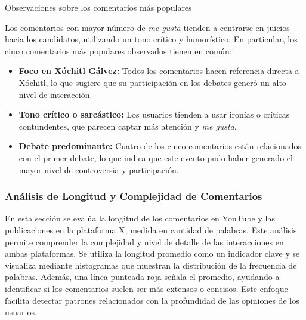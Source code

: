 \documentclass[10pt, a4paper]{article}
\begin{document}
	
	Observaciones sobre los comentarios más populares
	
	Los comentarios con mayor número de \textit{me gusta} tienden a centrarse en juicios hacia los candidatos, utilizando un tono crítico y humorístico. En particular, los cinco comentarios más populares observados tienen en común:
	
	\begin{itemize}
		\item \textbf{Foco en Xóchitl Gálvez:} Todos los comentarios hacen referencia directa a Xóchitl, lo que sugiere que su participación en los debates generó un alto nivel de interacción.
		\item \textbf{Tono crítico o sarcástico:} Los usuarios tienden a usar ironías o críticas contundentes, que parecen captar más atención y \textit{me gusta}.
		\item \textbf{Debate predominante:} Cuatro de los cinco comentarios están relacionados con el primer debate, lo que indica que este evento pudo haber generado el mayor nivel de controversia y participación.
	\end{itemize}
	
	
	\subsubsection{Análisis de Longitud y Complejidad de Comentarios}
	En esta sección se evalúa la longitud de los comentarios en YouTube y las publicaciones en la plataforma X, medida en cantidad de palabras. Este análisis permite comprender la complejidad y nivel de detalle de las interacciones en ambas plataformas. Se utiliza la longitud promedio como un indicador clave y se visualiza mediante histogramas que muestran la distribución de la frecuencia de palabras. Además, una línea punteada roja señala el promedio, ayudando a identificar si los comentarios suelen ser más extensos o concisos. Este enfoque facilita detectar patrones relacionados con la profundidad de las opiniones de los usuarios.
	
\end{document}
